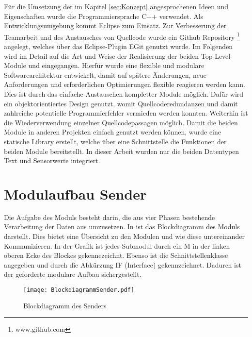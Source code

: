 
F{\"u}r die Umsetzung der im Kapitel \ref{sec:Konzept} angesprochenen Ideen und
Eigenschaften wurde die Programmiersprache C++ verwendet. Als Entwicklungsumgebung kommt
Eclipse zum Einsatz. Zur Verbesserung der Teamarbeit und des Austausches
von Quellcode wurde ein Github Repository \footnote{www.github.com} angelegt,
welches {\"u}ber das Eclipse-Plugin EGit genutzt wurde. \newline Im Folgenden wird
im Detail auf die Art und Weise der Realisierung der beiden Top-Level-Module
 und  eingegangen. Hierf{\"u}r wurde eine flexible und
modulare Softwarearchitektur entwickelt, damit auf sp{\"a}tere {\"A}nderungen, neue Anforderungen
und erforderlichen Optimierungen flexible reagieren werden kann. Dies ist durch
das einfache Austauschen kompletter Module m{\"o}glich.
Daf{\"u}r wird ein objektorientiertes Design genutzt, womit Quellcoderedundanzen und damit
zahlreiche potentielle Programmierfehler vermieden werden konnten.
Weiterhin ist die Wiederverwendung einzelner Quellcodepassagen m{\"o}glich.\newline
Damit die beiden Module in anderen Projekten einfach genutzt werden k{\"o}nnen,
wurde eine statische Library erstellt, welche {\"u}ber eine Schnittstelle die Funktionen
der beiden Module bereitstellt. In dieser Arbeit wurden nur die beiden
Datentypen Text und Sensorwerte integriert.

\section{Modulaufbau Sender}

Die Aufgabe des Moduls  besteht darin, die aus vier Phasen
bestehende Verarbeitung der Daten aus 
umzusetzen.
In  ist das Blockdiagramm des Moduls 
darstellt.
Dies bietet eine {\"U}bersicht zu den Modulen und wie diese untereinander 
Kommunizieren. In der Grafik ist jedes Submodul durch ein M in der linken
oberen Ecke des Blockes gekennezeichnt. Ebenso ist die Schnittstellenklasse angegeben
und durch die Abk{\"u}rzung IF (Interface) gekennzeichnet. Dadurch ist der geforderte modulare
Aufbau sichergestellt.

\begin{figure}[H]
\centering
\texttt{[image: BlockdiagrammSender.pdf]} %
\caption{Blockdiagramm des Senders}
\label{fig:BlockdiagrammSender}
\end{figure}

